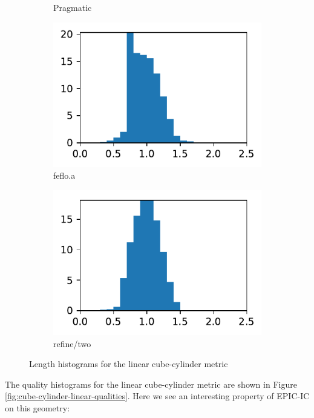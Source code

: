 \documentclass[3p,times,procedia,number]{elsarticle}
\begin{document}
\begin{figure}
\begin{subfigure}{.16\textwidth}
\caption{Pragmatic}
\end{subfigure}
\begin{subfigure}{.16\textwidth}
\centering
\includegraphics[width=\textwidth]{fefloa-cube-cylinder-linear-length.pdf}
\caption{feflo.a}
\end{subfigure}
\begin{subfigure}{.16\textwidth}
\centering
\includegraphics[width=\textwidth]{refine-two-cube-cylinder-linear-length.pdf}
\caption{refine/two}
\end{subfigure}
\caption{Length histograms for the linear cube-cylinder metric}
\label{fig:cube-cylinder-linear-lengths}
\end{figure}
The quality histograms for the linear cube-cylinder metric
are shown in Figure \ref{fig:cube-cylinder-linear-qualities}.
Here we see an interesting property of EPIC-IC on this geometry:
\end{document}
